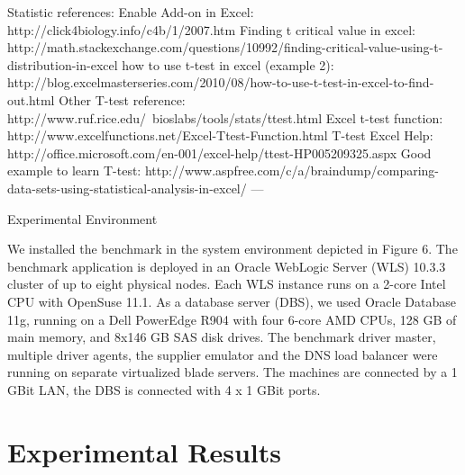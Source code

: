 \documentclass[runningheads,a4paper]{llncs}
\begin{document}
Statistic references:
Enable Add-on in Excel: http://click4biology.info/c4b/1/2007.htm
Finding t critical value in excel: http://math.stackexchange.com/questions/10992/finding-critical-value-using-t-distribution-in-excel
how to use t-test in excel (example 2): http://blog.excelmasterseries.com/2010/08/how-to-use-t-test-in-excel-to-find-out.html
Other T-test reference: http://www.ruf.rice.edu/~bioslabs/tools/stats/ttest.html
Excel t-test function: http://www.excelfunctions.net/Excel-Ttest-Function.html
T-test Excel Help: http://office.microsoft.com/en-001/excel-help/ttest-HP005209325.aspx
Good example to learn T-test: http://www.aspfree.com/c/a/braindump/comparing-data-sets-using-statistical-analysis-in-excel/
---

Experimental Environment

We installed the benchmark in the system environment depicted in Figure 6. The
benchmark application is deployed in an Oracle WebLogic Server (WLS) 10.3.3 cluster of up to eight 
physical nodes. Each WLS instance runs on a 2-core Intel CPU with OpenSuse 11.1. As a database 
server (DBS), we used Oracle Database 11g, running on a Dell PowerEdge R904 with four 6-core AMD 
CPUs, 128 GB of main memory, and 8x146 GB SAS disk drives. The benchmark driver master, multiple 
driver agents, the supplier emulator and the DNS load balancer were running on separate 
virtualized blade servers. The machines are connected by a 1 GBit LAN, the DBS is connected with 
4 x 1 GBit ports.


\section{Experimental Results}


\end{document}
